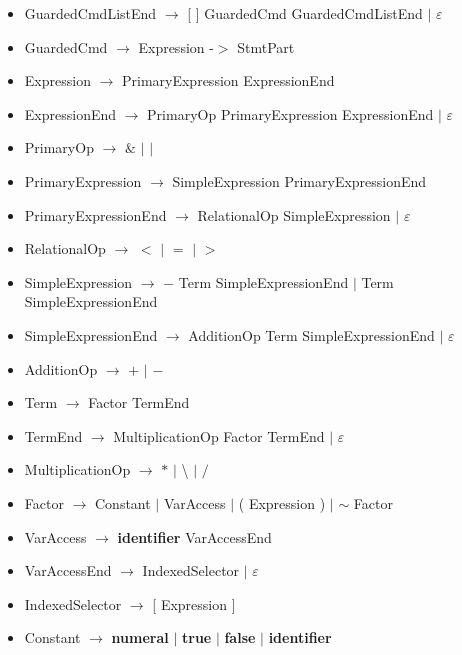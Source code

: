 \documentclass{article}
\let\bf\textbf
\newcommand{\der}{$\longrightarrow$ }
\newcommand{\es}{$\varepsilon$ }
\newcommand{\alt}{\Large$|$ \normalsize }
\begin{document}
\begin{itemize}[label={}]
        \item GuardedCmdListEnd \der [ ] GuardedCmd GuardedCmdListEnd \alt \es
        \item GuardedCmd \der Expression -$>$ StmtPart
        \item Expression \der PrimaryExpression ExpressionEnd
        \item ExpressionEnd \der PrimaryOp PrimaryExpression ExpressionEnd \alt \es
        \item PrimaryOp \der $\&$ \alt $|$
        \item PrimaryExpression \der SimpleExpression PrimaryExpressionEnd
        \item PrimaryExpressionEnd \der RelationalOp SimpleExpression \alt \es
        \item RelationalOp \der $<$ \alt $=$ \alt $>$
        \item SimpleExpression \der $-$ Term SimpleExpressionEnd \alt Term SimpleExpressionEnd
        \item SimpleExpressionEnd \der AdditionOp Term SimpleExpressionEnd \alt \es
        \item AdditionOp \der $+$ \alt $-$
        \item Term \der Factor TermEnd
        \item TermEnd \der MultiplicationOp Factor TermEnd \alt \es
        \item MultiplicationOp \der $*$ \alt \textbackslash\: \alt $/$ 
        \item Factor \der Constant \alt VarAccess \alt ( Expression ) \alt $\sim$ Factor
        \item VarAccess \der \bf{identifier} VarAccessEnd 
        \item VarAccessEnd \der IndexedSelector \alt \es
        \item IndexedSelector \der [ Expression ]
        \item Constant \der \bf{numeral} \alt \bf{true} \alt \bf{false} \alt \bf{identifier}
    \end{itemize}
\end{document}
